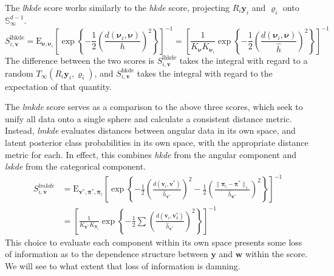     The \emph{lhkde} score works similarly to the \emph{hkde} score, projecting
    $R_i\bm{y}_i$ and $\bm{\varrho}_i$ onto $\mathbb{S}_{\infty}^{d-1}$.  
    \begin{equation}
        \label{eqn:adlhkdecat}
    S_{i,\bm{v}}^{\text{lhkde}} = \text{E}_{\bm{\nu},\bm{\nu}_i}
        \left[\exp\left\lbrace-\frac{1}{2}\left(
            \frac{d\left(\bm{\nu}_i, \bm{\nu}\right)}{h}\right)^2
        \right\rbrace\right]^{-1}
        = \left[
        \frac{1}{K_{\bm{\nu}}K_{\bm{\nu}_i}}\exp\left\lbrace
        -\frac{1}{2}\left(\frac{d(\bm{\nu}_i,\bm{\nu})}{\hat{h}}\right)^2
        \right\rbrace\right]^{-1}
    \end{equation}
    The difference between the two scores is $S_{i,\bm{v}}^{\text{lhkde}}$
    takes the integral with regard to a random 
    $T_{\infty}(R_i\bm{y}_i,\bm{\varrho}_i)$, and $S_{i,\bm{v}}^{\text{hkde}}$ 
    takes the integral with regard to the expectation of that quantity.

The \emph{lmkde} score serves as a comparison to the above three scores, 
    which seek to unify all data onto a single sphere and calculate a 
    consistent distance metric.  Instead, \emph{lmkde} evaluates distances 
    between angular data in its own space, and latent posterior class 
    probabilities in its own space, with the appropriate distance metric for 
    each.  In effect, this combines \emph{hkde} from
    the angular component and \emph{lskde} from the categorical component.
    \begin{equation}
    \label{eqn:lmkdecat}
    \begin{aligned}
    S_{i,\bm{v}}^{lmkde} &= \text{E}_{\bm{v}^*,\bm{\pi}^*,\bm{\pi}_i}\left[
        \exp
        \left\lbrace 
        -\frac{1}{2}
        \left(
        \frac{d\left(\bm{v}_i, \bm{v}^*\right)}{\hat{h}_{\bm{v}^*}}
        \right)^2
        -\frac{1}{2}
        \left(
        \frac{\lVert\bm{\pi}_i - \bm{\pi}^*\rVert_1}{\hat{h}_{\bm{\pi}^*}}
        \right)^2
        \right\rbrace
        \right]^{-1}\\
        &= \left[\frac{1}{K_{\bm{\pi}^*}K_{\bm{\pi}_i}}
            \exp\left\lbrace-\frac{1}{2}
            \sum_{}
            \left(\frac{d(\bm{v}_i,\bm{v}_k^*)}{\hat{h}_{\bm{v}^*}}\right)^2
            \right\rbrace\right]^{-1}
    \end{aligned}
    \end{equation}
    This choice to evaluate each component within its own space presents some 
    loss of information as to the dependence structure between $\bm{y}$ and 
    $\bm{w}$ within the score.  We will see to what extent that loss of 
    information is damning.

